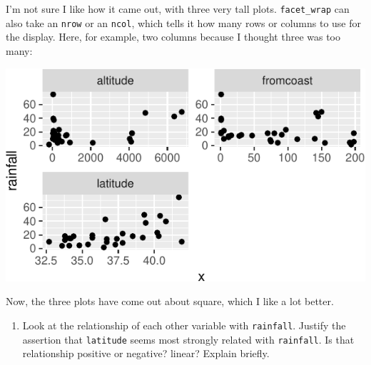 \documentclass[]{tufte-book}
\newenvironment{Shaded}{}{}
\newcommand{\DataTypeTok}[1]{\textcolor[rgb]{0.56,0.13,0.00}{#1}}
\newcommand{\DecValTok}[1]{\textcolor[rgb]{0.25,0.63,0.44}{#1}}
\newcommand{\KeywordTok}[1]{\textcolor[rgb]{0.00,0.44,0.13}{\textbf{#1}}}
\newcommand{\NormalTok}[1]{#1}
\newcommand{\OperatorTok}[1]{\textcolor[rgb]{0.40,0.40,0.40}{#1}}
\newcommand{\StringTok}[1]{\textcolor[rgb]{0.25,0.44,0.63}{#1}}
\providecommand{\tightlist}{%
  \setlength{\itemsep}{0pt}\setlength{\parskip}{0pt}}
\theoremstyle{definition}
\theoremstyle{definition}
\theoremstyle{definition}
\theoremstyle{remark}
\begin{document}
I'm not sure I like how it came out, with three very tall plots.
\texttt{facet\_wrap} can also take an \texttt{nrow} or an \texttt{ncol},
which tells it how many rows or columns to use for the display. Here,
for example, two columns because I thought three was too many:

\begin{Shaded}
\end{Shaded}

\includegraphics{12-regression_files/figure-latex/unnamed-chunk-12-1}

Now, the three plots have come out about square, which I like a lot
better.

\begin{enumerate}
\def\labelenumi{(\alph{enumi})}
\setcounter{enumi}{3}
\tightlist
\item
  Look at the relationship of each other variable with
  \texttt{rainfall}. Justify the assertion that \texttt{latitude} seems
  most strongly related with \texttt{rainfall}. Is that relationship
  positive or negative? linear? Explain briefly.
\end{enumerate}
\end{document}
